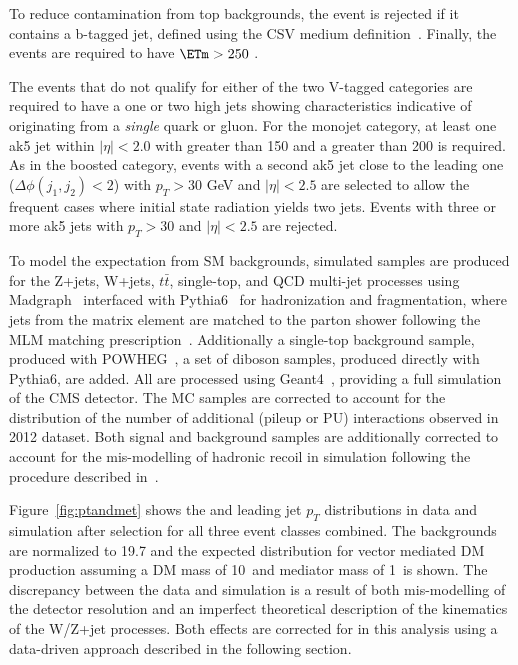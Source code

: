 To reduce contamination from top backgrounds, the event is rejected if it contains a 
b-tagged jet, defined using the CSV medium definition~\cite{BTAG}. Finally, the events are required to 
have $\ETm>250$ \gev. 

The events that do not qualify for either of the two V-tagged categories are required to have a one or two high \pt jets showing characteristics indicative of originating from a \emph{single} quark or gluon. 
For the monojet category, at least one ak5 jet within $|\eta|<2.0$ with \pt greater 
than 150 \gev and a \ETm greater than 200 \gev is required.  
As in the boosted category, events with a second ak5 jet close to the leading one ($\Delta\phi(j_1,j_2) < 2$) 
with $p_T>30$ GeV and $|\eta|<2.5$ are selected to allow the frequent cases where initial state radiation yields two jets.
Events with three or more ak5 jets with $p_T>30$ \gev and $|\eta|<2.5$ are rejected.

To model the expectation from SM backgrounds, simulated samples are produced for the
Z+jets, W+jets, $t\bar{t}$, single-top, and QCD multi-jet processes
using Madgraph~\cite{amcatnlo} interfaced with Pythia6~\cite{Sjostrand:2006za} for hadronization and
fragmentation, where jets from the matrix element are matched to the parton shower following the MLM matching prescription~\cite{Mangano:2006rw}.
Additionally a single-top background sample, produced with
POWHEG~\cite{powheg},  a set of diboson samples, produced directly
with Pythia6, are added. All are processed using Geant4~\cite{geant4}, providing a full simulation of the CMS detector.
The MC samples are corrected to account for the distribution of the number of additional (pileup or PU) interactions
observed in 2012 dataset. Both signal and background samples are additionally corrected to account for the mis-modelling of hadronic recoil in simulation following
the procedure described in~\cite{CMS-PAS-JME-12-002}.


Figure~\ref{fig:ptandmet} shows the \ETm and leading jet $p_{T}$ distributions in data and 
simulation after selection for all three event classes combined. The backgrounds are normalized to 19.7\fbinv 
and the expected distribution for vector mediated DM production assuming a DM mass of 10~\GeV and mediator mass of 1~\TeV is shown. 
The discrepancy between the data and simulation is a result of both mis-modelling of the 
detector resolution and an imperfect theoretical description of the kinematics of the W/Z+jet processes. 
Both effects are corrected for in this analysis using a data-driven approach described in the following section. 

